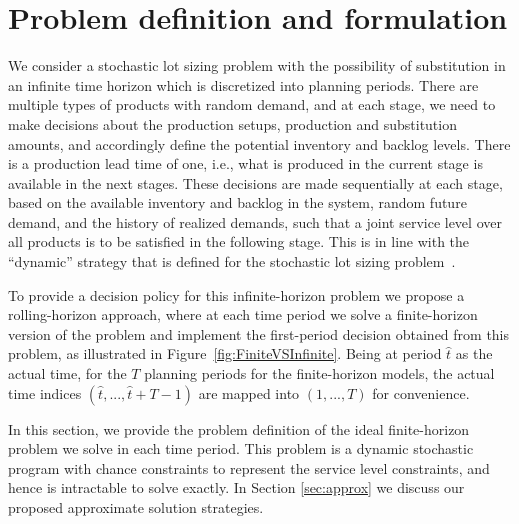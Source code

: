 \documentclass[11pt]{article}
\newcommand{\ti}{t} %
\newcommand{\Ti}{T}
\newcommand{\KA}{\mathcal{K}}
\newcommand{\Ka}{K}
\newcommand{\tAct}{\hat{\ti}} %
\newcommand{\cred}{\color{black}}
\begin{document}
\section{Problem definition and formulation}
We consider a stochastic lot sizing problem with the possibility of substitution in an infinite time horizon which is discretized into planning periods. %
There are multiple types of products with random demand, and at each stage, we need to make decisions about the production setups, production and substitution amounts, and accordingly define the potential inventory and backlog levels. There is a production lead time of one, i.e., what is produced in the current stage is available in the next stages. 
These decisions are made sequentially at each stage, based on the available inventory and backlog in the system, random future demand, and the history of realized demands, such that a joint service level over all products is to be satisfied in the following stage. This is in line with the  ``dynamic'' strategy that is defined for the stochastic lot sizing problem~\cite{bookbinder1988strategies}. 

To provide a decision policy for this infinite-horizon problem we propose a rolling-horizon approach, where at each time period we solve a finite-horizon version of the problem and implement the first-period decision obtained from this problem, as illustrated in Figure~\ref{fig:FiniteVSInfinite}. {\cred Being at period $\tAct$ as the actual time, for the $\Ti$ planning periods for the finite-horizon models, the actual time indices $(\tAct, ..., \tAct +\Ti -1) $ are mapped into $(1, ..., \Ti)$ for convenience.} 

In this section, we provide the problem definition of the ideal finite-horizon problem we solve in each time period. This problem is a dynamic stochastic program with chance constraints to represent the service level constraints, and hence is intractable to solve exactly. In Section \ref{sec:approx} we discuss our proposed approximate solution strategies.
\end{document}
